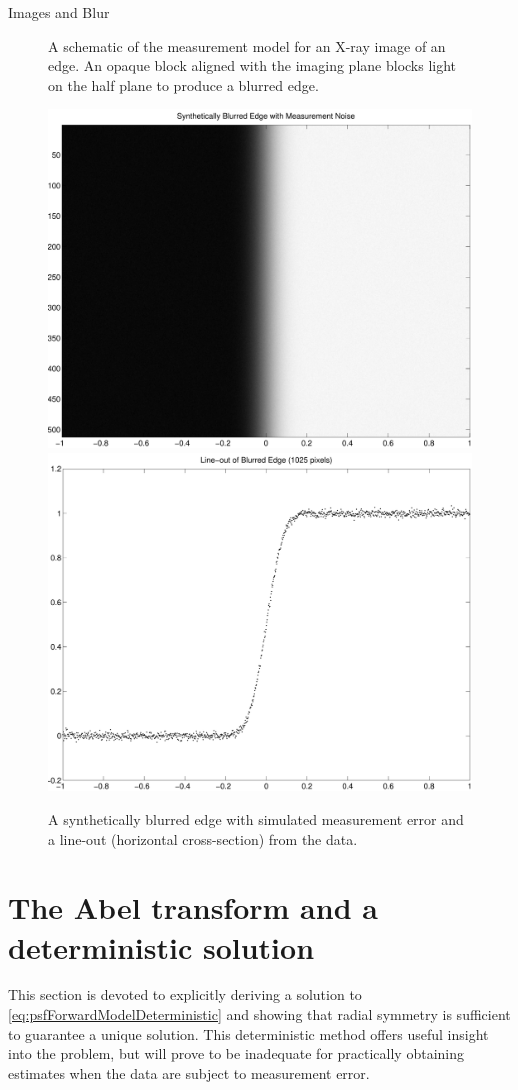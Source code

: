 \begin{chapter}{Images and Blur}
\begin{figure}
\begin{center}
\begin{tikzpicture}[scale=.8,every node/.style={minimum size=1cm},on grid]
    \end{tikzpicture}
  \caption{ A schematic of the measurement model for an X-ray image of an edge. An opaque block aligned with the imaging plane blocks light on the half plane to produce a blurred edge.}\label{fig:edgePicture}
\end{center}
\end{figure}

\begin{figure}
\begin{center}
  \includegraphics[width=.45\textwidth]{figures/blurredEdgeData.pdf}
  \includegraphics[width=.45\textwidth]{figures/psfLineoutData.pdf}
  \caption{A synthetically blurred edge with simulated measurement error and a line-out (horizontal cross-section) from the data.} \label{fig:edgeData}
\end{center}
\end{figure}
  
\section{The Abel transform and a deterministic solution}

  This section is devoted to explicitly deriving a solution to \eqref{eq:psfForwardModelDeterministic} and showing that radial symmetry is sufficient to guarantee a unique solution.
  This deterministic method offers useful insight into the problem, but will prove to be inadequate for practically obtaining estimates when the data are subject to measurement error.


\end{chapter}
